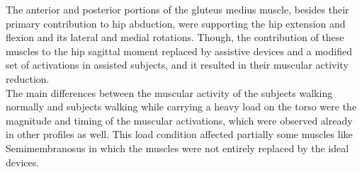 \documentclass[10pt,letterpaper]{article}
\begin{document}
The anterior and posterior portions of the gluteus medius muscle, besides their primary contribution to hip abduction, were supporting the hip extension and flexion and its lateral and medial rotations. Though, the contribution of these muscles to the hip sagittal moment replaced by assistive devices and a modified set of activations in assisted subjects, and it resulted in their muscular activity reduction.\\
The main differences between the muscular activity of the subjects walking normally and subjects walking while carrying a heavy load on the torso were the magnitude and timing of the muscular activations, which were observed already in other profiles as well. This load condition affected partially some muscles like Semimembranosus in which the muscles were not entirely replaced by the ideal devices.
\end{document}
